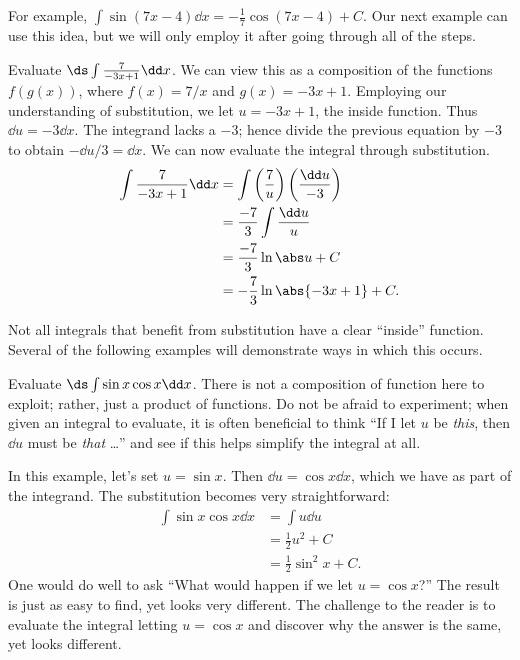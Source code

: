 For example, $\int \sin (7x-4)\dd x = -\frac17\cos(7x-4)+C$. Our next example can use this idea, but we will only employ it after going through all of the steps.

\begin{example}\label{ex_sub3}%
Evaluate $\ds \int \frac{7}{-3x+1}\dd x$.
\solution
We can view this as a composition of the functions $f(g(x))$, where $f(x) = 7/x$ and $g(x) = -3x+1$. Employing our understanding of substitution, we let $u = -3x+1$, the inside function. Thus $\dd u = -3\dd x$. The integrand lacks a $-3$; hence divide the previous equation by $-3$ to obtain $-\dd u/3 = \dd x$. We can now evaluate the integral through substitution.
\begin{align*}
	\int \frac{7}{-3x+1}\dd x
	&= \int\left(\frac{7}{u}\right)\left(\frac{\dd u}{-3}\right) \\
	&= \frac{-7}3\int \frac{\dd u}{u} \\
	&= \frac{-7}3\ln \abs u + C\\
	&= -\frac73\ln\abs{-3x+1} + C.
\end{align*}
\end{example}

Not all integrals that benefit from substitution have a clear ``inside'' function. Several of the following examples will demonstrate ways in which this occurs.

\begin{example}\label{ex_sub10}%
Evaluate $\ds \int \sin x\cos x\dd x$.
\solution
There is not a composition of function here to exploit; rather, just a product of functions. Do not be afraid to experiment; when given an integral to evaluate, it is often beneficial to think ``If I let $u$ be \emph{this}, then $\dd u$ must be \emph{that} \ldots'' and see if this helps simplify the integral at all.

In this example, let's set $u = \sin x$. Then $\dd u = \cos x\dd x$, which we have as part of the integrand. The substitution becomes very straightforward:
\begin{align*}
	\int \sin x\cos x\dd x
	&=	\int u\dd u \\
	&= \frac12u^2+ C \\
	&= \frac12\sin^2 x + C.
\end{align*}
One would do well to ask ``What would happen if we let $u = \cos x$?'' The result is just as easy to find, yet looks very different. The challenge to the reader is to evaluate the integral letting $u = \cos x$ and discover why the answer is the same, yet looks different.
\end{example}

